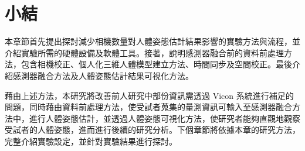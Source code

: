 \section{小結}
本章節首先提出探討減少相機數量對人體姿態估計結果影響的實驗方法與流程，並介紹實驗所需的硬體設備及軟體工具。接著，說明感測器融合前的資料前處理方法，包含相機校正、個人化三維人體模型建立方法、時間同步及空間校正。最後介紹感測器融合方法及人體姿態估計結果可視化方法。

藉由上述方法，本研究將改善前人研究中部份資訊需透過 Vicon 系統進行補足的問題，同時藉由資料前處理方法，使受試者蒐集的量測資訊可輸入至感測器融合方法中，進行人體姿態估計，並透過人體姿態可視化方法，使研究者能夠直觀地觀察受試者的人體姿態，進而進行後續的研究分析。下個章節將依據本章的研究方法，完整介紹實驗設定，並針對實驗結果進行探討。
\clearpage